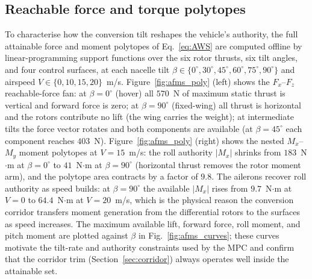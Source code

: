 \documentclass[preprint,3p,11pt]{elsarticle}
\begin{document}
\subsection{Reachable force and torque polytopes}\label{sec:afms_poly}
To characterise how the conversion tilt reshapes the vehicle's authority, the
full attainable force and moment polytopes of Eq.~\eqref{eq:AWS} are computed
offline by linear-programming support functions over the six rotor thrusts,
six tilt angles, and four control surfaces, at each nacelle tilt
$\beta\in\{0^\circ,30^\circ,45^\circ,60^\circ,75^\circ,90^\circ\}$ and
airspeed $V\in\{0,10,15,20\}$~m/s.  Figure~\ref{fig:afms_poly} (left) shows the
$F_x$--$F_z$ reachable-force fan: at $\beta=0^\circ$ (hover) all $570$~N of
maximum static thrust is vertical and forward force is zero; at $\beta=90^\circ$
(fixed-wing) all thrust is horizontal and the rotors contribute no lift (the
wing carries the weight); at intermediate tilts the force vector rotates and
both components are available (at $\beta=45^\circ$ each component reaches
$403$~N).  Figure~\ref{fig:afms_poly} (right) shows the nested $M_x$--$M_y$ moment
polytopes at $V=15$~m/s: the roll authority $|M_x|$ shrinks from
$183$~N$\cdot$m at $\beta=0^\circ$ to $41$~N$\cdot$m at $\beta=90^\circ$
(horizontal thrust removes the rotor moment arm), and the polytope area
contracts by a factor of $9.8$.  The ailerons recover roll authority as speed
builds: at $\beta=90^\circ$ the available $|M_x|$ rises from $9.7$~N$\cdot$m
at $V=0$ to $64.4$~N$\cdot$m at $V=20$~m/s, which is the physical reason the
conversion corridor transfers moment generation from the differential rotors
to the surfaces as speed increases.  The maximum available lift, forward
force, roll moment, and pitch moment are plotted against $\beta$ in
Fig.~\ref{fig:afms_curves}; these
curves motivate the tilt-rate and authority constraints used by the MPC and
confirm that the corridor trim (Section~\ref{sec:corridor}) always operates
well inside the attainable set.
\end{document}
